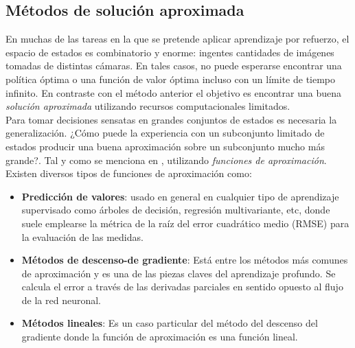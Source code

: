 \subsection{Métodos de solución aproximada}

En muchas de las tareas en la que se pretende aplicar aprendizaje por refuerzo, el espacio de estados es combinatorio y enorme: ingentes cantidades de imágenes tomadas de distintas cámaras. En tales casos, no puede esperarse encontrar una política óptima o una función de valor óptima incluso con un límite de tiempo infinito. En contraste con el método anterior el objetivo es encontrar una buena \textit{solución aproximada} utilizando recursos computacionales limitados.\\

Para tomar decisiones sensatas en grandes conjuntos de estados es necesaria la generalización. ¿Cómo puede la experiencia con un subconjunto limitado de estados producir una buena aproximación sobre un subconjunto mucho más grande?. Tal y como se menciona en \cite{sutton_barto}, utilizando \textit{funciones de aproximación}.\\

Existen diversos tipos de funciones de aproximación como:\\
\begin{itemize}
    \item \textbf{Predicción de valores}: usado en general en cualquier tipo de aprendizaje supervisado como árboles de decisión, regresión multivariante, etc, donde suele emplearse la métrica de la raíz del error cuadrático medio (RMSE) para la evaluación de las medidas.\\
    \item \textbf{Métodos de descenso-de gradiente}: Está entre los métodos más comunes de aproximación y es una de las piezas claves del aprendizaje profundo. Se calcula el error a través de las derivadas parciales en sentido opuesto al flujo de la red neuronal.\\
    \item \textbf{Métodos lineales}: Es un caso particular del método del descenso del gradiente donde la función de aproximación es una función lineal.
\end{itemize}

